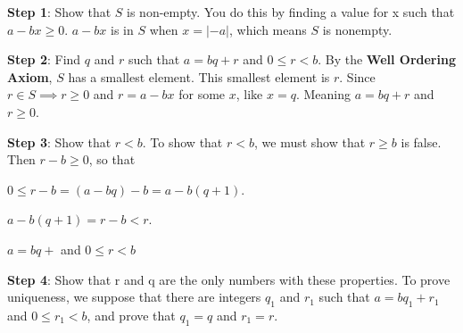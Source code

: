 \documentclass{article}
\begin{document}
\textbf{Step 1}: Show that $S$ is non-empty.
You do this by finding a value for x such that $a-bx \geq{} 0$.
$a-bx$ is in $S$ when $x = \left\lvert -a\right\rvert $, which means $S$ is nonempty.
\medskip

\textbf{Step 2}: Find $q$ and $r$ such that $a = bq + r$ and $0 \leq{} r < b$.
By the \textbf{Well Ordering Axiom}, $S$ has a smallest element.  This smallest element is $r$.
Since $r \in S \implies r \geq 0$ and $r = a -bx$ for some $x$, like $x = q$.
Meaning $a = bq +r$ and $r \geq 0$.

\textbf{Step 3}: Show that $r < b$.
To show that $r < b$, we must show that $r \geq b$ is false. Then $r-b\geq 0$, so that
\begin{center}
    $0 \leq r-b=( a-bq) -b =  a-b( q+1)$.

    $a-b( q+1) = r-b < r$.

    $a=bq+$ and $0\leq r <b$
\end{center}

\textbf{Step 4}: Show that r and q are the only numbers with these properties.
To prove uniqueness, we suppose that there are integers
$q_1$ and $r_1$ such that $a = bq_1 + r_1$ and $0 \leq r_1 < b$, and prove that $q_1 = q$
and $r_1 = r$.
\end{document}
